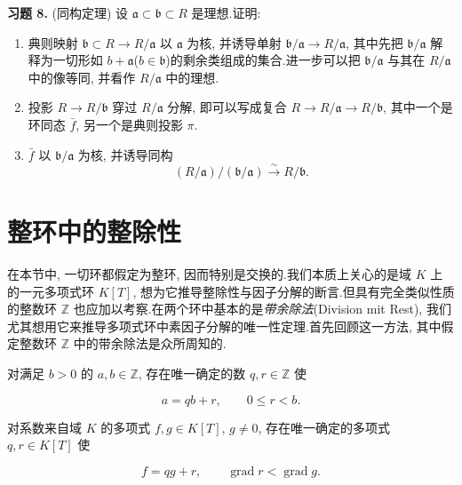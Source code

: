 \medskip
\noindent\textbf{习题 8.} (同构定理) 设 $\mathfrak{a} \subset \mathfrak{b} \subset R$ 是理想.证明:
\begin{enumerate}
\item[(i)] 典则映射 $\mathfrak{b} \subset R \longrightarrow R/\mathfrak{a}$ 以 $\mathfrak{a}$ 为核, 并诱导单射 $\mathfrak{b}/\mathfrak{a} \longrightarrow R/\mathfrak{a}$, 其中先把 $\mathfrak{b}/\mathfrak{a}$ 解释为一切形如 $b + \mathfrak{a}$($b \in \mathfrak{b}$)的剩余类组成的集合.进一步可以把 $\mathfrak{b}/\mathfrak{a}$ 与其在 $R/\mathfrak{a}$ 中的像等同, 并看作 $R/\mathfrak{a}$ 中的理想.
\item[(ii)] 投影 $R \longrightarrow R/\mathfrak{b}$ 穿过 $R/\mathfrak{a}$ 分解, 即可以写成复合 $R \longrightarrow R/\mathfrak{a} \longrightarrow R/\mathfrak{b}$, 其中一个是环同态 $\bar{f}$, 另一个是典则投影 $\pi$.
\item[(iii)] $\bar{f}$ 以 $\mathfrak{b}/\mathfrak{a}$ 为核, 并诱导同构
\[
(R/\mathfrak{a})/(\mathfrak{b}/\mathfrak{a}) \xrightarrow{\sim} R/\mathfrak{b}\text{.}
\]
\end{enumerate}

\section{整环中的整除性}\label{sec:5.2}

在本节中, 一切环都假定为整环, 因而特别是交换的.我们本质上关心的是域 $K$ 上的一元多项式环 $K[T]$, 想为它推导整除性与因子分解的断言.但具有完全类似性质的整数环 $\mathbb{Z}$ 也应加以考察.在两个环中基本的是\emph{带余除法}(\textup{Division mit Rest}), 我们尤其想用它来推导多项式环中素因子分解的唯一性定理.首先回顾这一方法, 其中假定整数环 $\mathbb{Z}$ 中的带余除法是众所周知的.

\begin{theorem}\label{thm:5.2.1}
对满足 $b > 0$ 的 $a, b \in \mathbb{Z}$, 存在唯一确定的数 $q, r \in \mathbb{Z}$ 使

\[
a = qb + r, \qquad 0 \leq r < b\text{.}
\]
\end{theorem}

\begin{theorem}\label{thm:5.2.2}
对系数来自域 $K$ 的多项式 $f, g \in K[T]$, $g \neq 0$, 存在唯一确定的多项式 $q, r \in K[T]$ 使

\[
f = qg + r, \qquad \operatorname{grad} r < \operatorname{grad} g\text{.}
\]
\end{theorem}

